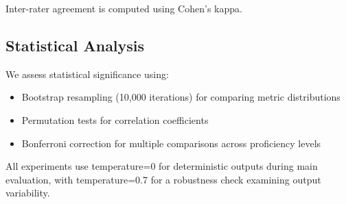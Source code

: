 Inter-rater agreement is computed using Cohen's kappa.

\subsection{Statistical Analysis}

We assess statistical significance using:
\begin{itemize}
    \item Bootstrap resampling (10,000 iterations) for comparing metric distributions
    \item Permutation tests for correlation coefficients
    \item Bonferroni correction for multiple comparisons across proficiency levels
\end{itemize}

All experiments use temperature=0 for deterministic outputs during main evaluation, with temperature=0.7 for a robustness check examining output variability.
